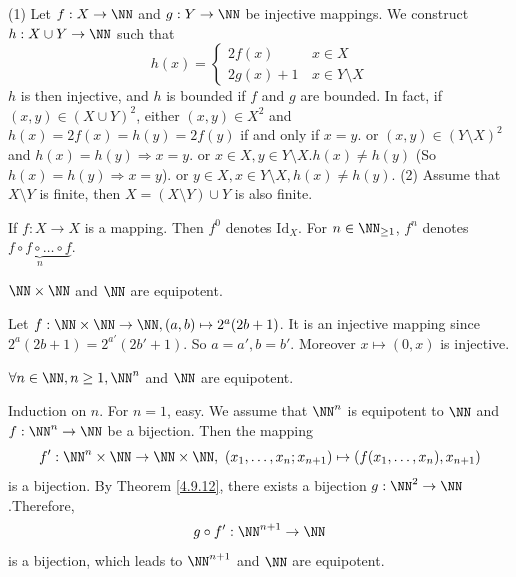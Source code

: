 \begin{proofenv}
    \quad
    \newline
    (1) Let $f:X\rightarrow \NN$ and $g:Y\rightarrow \NN$ be injective mappings. We construct $h:X\cup Y\rightarrow \NN$ such that 
    $$h(x)=\left\{\begin{matrix}
     2f(x)\,  &x\in X\\
    2g(x)+1\, &x\in Y\setminus X
    \end{matrix}\right.$$
    $h$ is then injective,  and $h$ is bounded if $f$ and $g$ are bounded.
    \newline
    In fact,  if $(x, y)\in (X\cup Y)^2$, 
    \newline
    either $(x, y)\in X^2$ and $h(x)=2f(x)=h(y)=2f(y)$ if and only if $x=y$.
    \newline
    or $(x, y)\in (Y\setminus X)^2$ and $h(x)=h(y)\Rightarrow x=y$.
    \newline
    or $x\in X, y\in Y\setminus X.h(x)\not=h(y)$ (So $h(x)=h(y)\Rightarrow x=y$).
    \newline
    or $y\in X, x\in Y\setminus X , h(x)\not=h(y)$.
    \newline
    (2)  Assume that $X\setminus Y$ is finite,  then $X=(X\setminus Y)\cup Y$ is also finite.
\end{proofenv}
\begin{notationenv}
    If $f:X\rightarrow X$  is a mapping. Then $f^0$ denotes $\mathrm{Id}_X$. For $n\in\NN_{\ge 1}$, $f^n$ denotes $\underset{n}{\underbrace{f\circ f\circ \dots \circ f}}$. 
\end{notationenv}
\begin{theoremenv}\label{4.9.12}
    $\NN\times\NN$ and $\NN$ are equipotent.
\end{theoremenv}
\begin{proofenv}
    Let $f:\NN\times\NN\rightarrow \NN, (a, b)\mapsto2^a(2b+1)$. It is an injective mapping since $2^a(2b+1)=2^{a'}(2b'+1)$. So $a=a', b=b'$. Moreover $x\mapsto(0, x)$ is injective.
\end{proofenv}
\begin{corollaryenv}
    $\forall n\in \NN,  n\ge 1, \NN^n$ and $\NN$ are equipotent.
\end{corollaryenv}
\begin{proofenv}
    Induction on $n$.
    \newline
    For $n=1$,  easy. We assume that $\NN^n$ is equipotent to $\NN$ and $f:\NN^n\rightarrow\NN$ be a bijection. Then the mapping
    $$f':\NN^n\times \NN\rightarrow \NN\times\NN, \ \left(x_1, \dots, x_n;x_{n+1}\right)\mapsto\left(f(x_1, \dots, x_n), x_{n+1}\right)$$ 
    is a bijection. By Theorem \ref{4.9.12},  there exists a bijection $g:\NN^2\rightarrow\NN$.Therefore, 
    $$g\circ f':\NN^{n+1}\rightarrow\NN$$
    is a bijection,  which leads to $\NN^{n+1}$ and $\NN$ are equipotent.
\end{proofenv}


